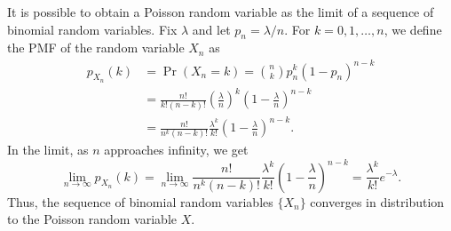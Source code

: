 It is possible to obtain a Poisson random variable as the limit of a sequence of binomial random variables.
Fix $\lambda$ and let $p_n = \lambda/n$.
For $k = 0, 1, \ldots, n$, we define the PMF of the random variable $X_n$ as
\begin{equation*}
\begin{split}
p_{X_n} (k) &= \Pr (X_n = k)
= \binom{n}{k} p_n^k (1-p_n)^{n-k} \\
&= \frac{n!}{k!(n-k)!} \left( \frac{\lambda}{n} \right)^k
\left( 1 - \frac{\lambda}{n} \right)^{n-k} \\
&= \frac{n!}{n^k (n-k)!} \frac{\lambda^k}{k!}
\left( 1 - \frac{\lambda}{n} \right)^{n-k} .
\end{split}
\end{equation*}
In the limit, as $n$ approaches infinity, we get
\begin{equation*}
\lim_{n \rightarrow \infty} p_{X_n} (k)
= \lim_{n \rightarrow \infty} \frac{n!}{n^k (n-k)!} \frac{\lambda^k}{k!}
\left( 1 - \frac{\lambda}{n} \right)^{n-k}
= \frac{\lambda^k}{k!} e^{- \lambda} .
\end{equation*}
Thus, the sequence of binomial random variables $\{ X_n \}$ converges in distribution to the Poisson random variable $X$.

